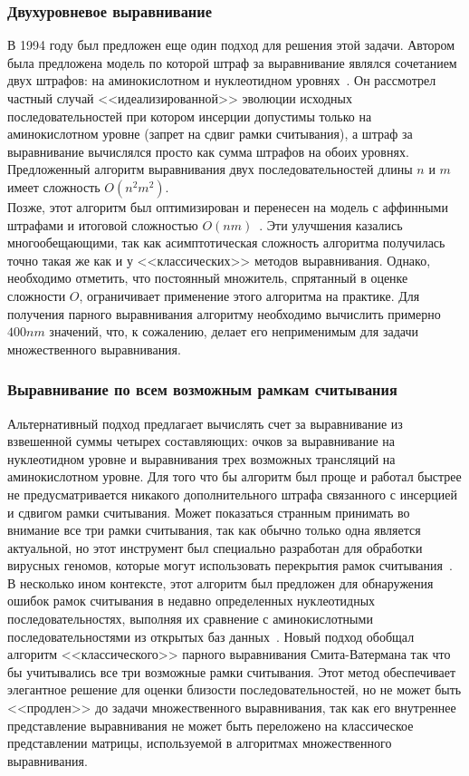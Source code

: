 \subsubsection[Двухуровневое выравнивание]{\large Двухуровневое выравнивание}
\hspace{\parindent} В 1994 году был предложен еще один подход для решения этой задачи. Автором была предложена модель по которой штраф за выравнивание являлся сочетанием двух штрафов: на аминокислотном и нуклеотидном уровнях~\cite{Hein}. Он рассмотрел частный случай <<идеализированной>> эволюции исходных последовательностей при котором инсерции допустимы только на аминокислотном уровне (запрет на сдвиг рамки считывания), а штраф за выравнивание вычислялся просто как сумма штрафов на обоих уровнях. Предложенный алгоритм выравнивания двух последовательностей длины $n$ и $m$ имеет сложность $O(n^2m^2)$.\\
\indent Позже, этот алгоритм был оптимизирован и перенесен на модель с аффинными штрафами и итоговой сложностью $O(nm)$~\cite{HeinOptimize}. Эти улучшения казались многообещающими, так как асимптотическая сложность алгоритма получилась точно такая же как и у <<классических>> методов выравнивания. Однако, необходимо отметить, что постоянный множитель, спрятанный в оценке сложности $O$, ограничивает применение этого алгоритма на практике. Для получения парного выравнивания алгоритму необходимо вычислить примерно $400nm$ значений, что, к сожалению, делает его неприменимым для задачи множественного выравнивания.

\subsubsection[Выравнивание по всем возможным рамкам считывания]{\large Выравнивание по всем возможным рамкам считывания}
\hspace{\parindent} Альтернативный подход предлагает вычислять счет за выравнивание из взвешенной суммы четырех составляющих: очков за выравнивание на нуклеотидном уровне и выравнивания трех возможных трансляций на аминокислотном уровне. Для того что бы алгоритм был проще и работал быстрее не предусматривается никакого дополнительного штрафа связанного с инсерцией и сдвигом рамки считывания. Может показаться странным принимать во внимание все три рамки считывания, так как обычно только одна является актуальной, но этот инструмент был специально разработан для обработки вирусных геномов, которые могут использовать перекрытия рамок считывания~\cite{VirusAlign}.\\
\indent В несколько ином контексте, этот алгоритм был предложен для обнаружения ошибок рамок считывания в недавно определенных нуклеотидных последовательностях, выполняя их сравнение с аминокислотными последовательностями из открытых баз данных~\cite{FrameshiftError}. Новый подход обобщал алгоритм <<классического>> парного выравнивания Смита-Ватермана так что бы учитывались все три возможные рамки считывания. Этот метод обеспечивает элегантное решение для оценки близости последовательностей, но не может быть <<продлен>> до задачи множественного выравнивания, так как его внутреннее представление выравнивания не может быть переложено на классическое представлении матрицы, используемой в алгоритмах множественного выравнивания.


